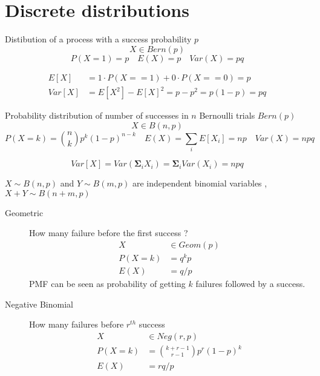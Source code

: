 \section{Discrete distributions}
\begin{slide} 
\begin{shaded}
    {\hfill Distibution of a process with a  success probability $p$\hfill}
    $$X \in Bern(p)$$
    $$
    P(X=1) = p 
    \quad 
    E(X)= p
    \quad
    Var(X)=pq
    $$
\end{shaded}
    
    \begin{align*}
        E[X] &= 1\cdot P(X==1) + 0\cdot P(X==0) =p \\
        Var[X] &= E[X^2]-E[X]^2 = p-p^2 =p(1-p) = pq
    \end{align*}
\end{slide}
\begin{slide} 
  \begin{shaded}
 {\hfill\noindent Probability distribution of number of successes in $n$ Bernoulli trials $Bern(p)$
 \hfill}
    $$X \in B(n,p)$$
    $$
    P(X=k) = {n \choose k} p^k(1-p)^{n-k} 
    \quad 
    E(X)=  \sum_iE[X_i] = np
    \quad
    Var(X)=npq
    $$
\end{shaded}
 $$   Var[X] = Var\left(\mathbf{\Sigma}_i X_i\right) = \mathbf{\Sigma}_i Var(X_i) = npq$$

\noindent{}
$X \sim B(n, p)$ and $Y \sim B(m, p)$ are independent binomial variables , $X+Y \sim B(n+m, p)$
\end{slide}

\begin{slidemaximus} 
\begin{multicols}{2}
\begin{description}
\item[Geometric] How many failure before the first success ?
\begin{align*}
    X &\in Geom(p)\\
    P(X=k) &= q^kp\\
    E(X)&= q/p
\end{align*}
PMF can be seen as probability of getting $k$ failures followed by a success. 
\item[Negative Binomial] How many failures before $r^{th}$ success
 \begin{align*}
    X &\in Neg(r,p)\\
    P(X=k) &= {k+r-1 \choose r-1}p^r(1-p)^k\\
    E(X)&= rq/p
 \end{align*}
\end{description}
\end{multicols}


\end{slidemaximus}

